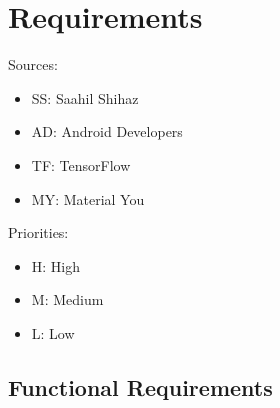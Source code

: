 \documentclass[12pt,a4paper]{report}
\begin{document}
\clearpage

\section{Requirements}

Sources:
\begin{itemize}
    \item SS: Saahil Shihaz
    \item AD: Android Developers
    \item TF: TensorFlow
    \item MY: Material You
\end{itemize}

Priorities:
\begin{itemize}
    \item H: High
    \item M: Medium
    \item L: Low
\end{itemize}

\subsection{Functional Requirements}
\label{subsec:funcreq}
\end{document}
